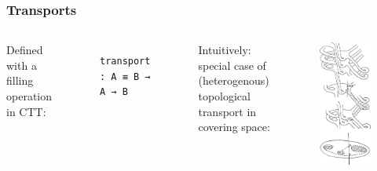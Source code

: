 \documentclass[english]{beamer}
\begin{document}
\begin{frame}[fragile]
\frametitle{Transports}
 
 
 \begin{columns}%
        Defined with a filling operation in CTT:
        \begin{figure}
            \begin{BVerbatim}
transport : A ≡ B → A → B
            \end{BVerbatim}
            \end{figure}
        Intuitively: special case of (heterogenous) topological transport in covering space:
        \begin{figure}
 \includegraphics[height=0.8\textheight]{figures/cover}
 \end{figure}

\end{columns}

 
 

 
\end{frame}
\end{document}
